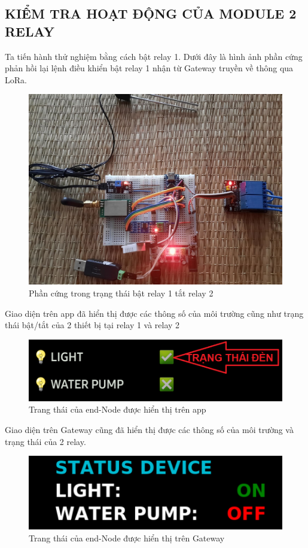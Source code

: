 \subsection{KIỂM TRA HOẠT ĐỘNG CỦA MODULE 2 RELAY}
Ta tiến hành thử nghiệm bằng cách bật relay 1. Dưới đây là hình ảnh phần cứng phản hồi lại lệnh điều khiển bật relay 1 nhận từ Gateway truyền về thông qua LoRa.
\begin{figure}[H]
	\centering
	\includegraphics[scale=0.2]{Chapter 4/image chapter 4/R1ONR2OFF.jpg}
	\caption[Phần cứng trong trạng thái bật relay 1 tắt relay 2]{Phần cứng trong trạng thái bật relay 1 tắt relay 2}
	\label{hinh45}
\end{figure}
\indent Giao diện trên app đã hiển thị được các thông số của môi trường cũng như trạng thái bật/tắt của 2 thiết bị tại relay 1 và relay 2
\begin{figure}[H]
	\centering
	\includegraphics[scale=0.2]{Chapter 4/image chapter 4/appR1ONR2OFF.png}
	\caption[Trang thái của end-Node được hiển thị trên app]{Trang thái của end-Node được hiển thị trên app}
	\label{hinh46}
\end{figure}
\indent Giao diện trên Gateway cũng đã hiển thị được các thông số của môi trường và trạng thái của 2 relay.
\begin{figure}[H]
	\centering
	\includegraphics[scale=0.3]{Chapter 4/image chapter 4/Relay1ON-Relay2OFF.png}
	\caption[Trang thái của end-Node được hiển thị trên Gateway]{Trang thái của end-Node được hiển thị trên Gateway}
	\label{hinh47}
\end{figure}
